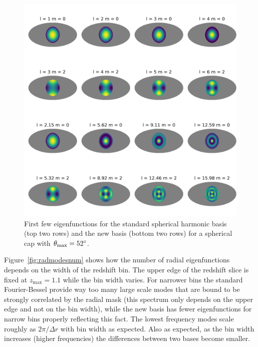 \documentclass[fleqn,usenatbib]{mnras}
\begin{document}
\begin{figure}
\includegraphics[clip,trim={0 1cm 0 1cm},width=\textwidth]{map.png}
\caption{First few eigenfunctions for the standard spherical harmonic basis
(top two rows) and the new basis (bottom two rows) for a spherical cap with
$\theta_\mathrm{max} = 52\degree$.}
\label{fig:angmodes}
\end{figure}

Figure~\ref{fig:radmodesnum} shows how the number of radial eigenfunctions
depends on the width of the redshift bin. The upper edge of the redshift slice
is fixed at $z_\mathrm{max} = 1.1$ while the bin width varies. For narrower
bins the standard Fourier-Bessel provide way too many large scale modes that
are bound to be strongly correlated by the radial mask (this spectrum only
depends on the upper edge and not on the bin width), while the new basis has
fewer eigenfunctions for narrow bins properly reflecting this fact. The lowest
frequency modes scale roughly as $2\pi/\Delta r$ with bin width as expected.
Also as expected, as the bin width increases (higher frequencies) the
differences between two bases become smaller.
\end{document}
